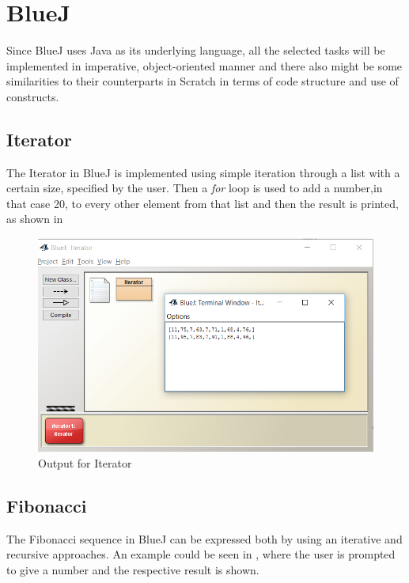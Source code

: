 \section{BlueJ}
\label{sec:bluej}
Since BlueJ uses Java as its underlying language, all the selected tasks will be implemented in imperative, object-oriented manner and there also might be some similarities to their counterparts in Scratch in terms of code structure and use of constructs.
\subsection{Iterator}
The Iterator in BlueJ is implemented using simple iteration through a list with a certain size, specified by the user. Then a \textit{for} loop is used to add a number,in that case 20, to every other element from that list and then the result is printed, as shown in 

\begin{figure}[!h]
  \centering
      \includegraphics[scale=0.7]{./pics/bluej_iterator_code}
      \caption{Output for Iterator}
      \label{fig:bluej_iterator_code} 
\end{figure}

\subsection{Fibonacci}
The Fibonacci sequence in BlueJ can be expressed both by using an iterative and recursive approaches. An example could be seen in , where the user is prompted to give a number and the respective result is shown.

